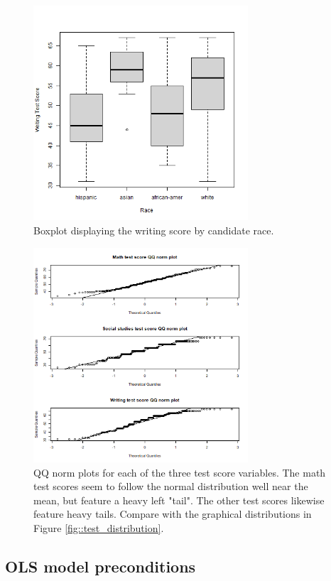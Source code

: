 \documentclass[10pt, a4paper]{article}
\begin{document}
	\begin{figure}[h!]
		\includegraphics[width=8cm]{write_race_boxplot.png}
		\centering
		\caption{Boxplot displaying the writing score by candidate race.}
		\label{fig::write_race_boxplot}
	\end{figure}

	\begin{figure}[h!]
		\includegraphics[width=8cm]{qqnorm_plots.png}
		\centering
		\caption{QQ norm plots for each of the three test score variables. The math test scores seem to follow the normal distribution well near the mean, but feature a heavy left "tail". The other test scores likewise feature heavy tails. Compare with the graphical distributions in Figure \ref{fig::test_distribution}.}
		\label{fig::test_qqnorm}
	\end{figure}
	
	
	\subsection{OLS model preconditions}
	
\end{document}
